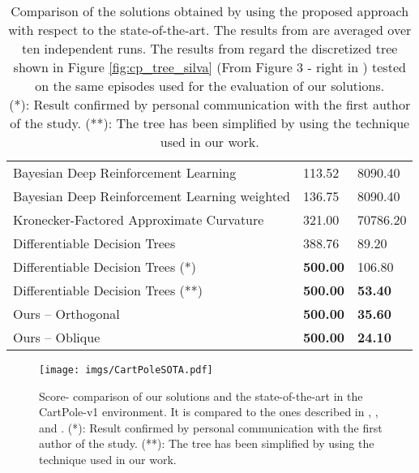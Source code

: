 \documentclass[review,english]{elsarticle}
\begin{document}
\begin{table}[p]
\begin{tabularx}{1\linewidth}{|X|l|l|}
    Bayesian Deep Reinforcement Learning {\cite{xuan_bayesian_2018}}           & 113.52 & 8090.40 \\
    Bayesian Deep Reinforcement Learning weighted {\cite{xuan_bayesian_2018}}  & 136.75 & 8090.40 \\
    Kronecker-Factored Approximate Curvature {\cite{van_der_aalst_optimizing_2020}} & 321.00 & 70786.20 \\
    Differentiable Decision Trees {\cite{silva_optimization_2020}} & 388.76 & {89.20} \\ 
    Differentiable Decision Trees {\cite{silva_optimization_2020}} (*) & \textbf{500.00} & 106.80 \\
    Differentiable Decision Trees {\cite{silva_optimization_2020}} (**) & \textbf{500.00} & \textbf{53.40} \\ \hline
    Ours – Orthogonal & \textbf{500.00} & \textbf{35.60}  \\
    Ours – Oblique & \textbf{500.00} & \textbf{24.10}  \\ \hline 
    \end{tabularx}

    \caption{Comparison of the solutions obtained by using the proposed approach with respect to the state-of-the-art.
    The results from \cite{meng_qualitative_2019} are averaged over ten independent runs.
    The results from \cite{silva_optimization_2020} regard the discretized tree shown in Figure \ref{fig:cp_tree_silva} (From Figure 3 - right in \cite{silva_optimization_2020}) tested on the same episodes used for the evaluation of our solutions.
    \\
    (*): Result confirmed by personal communication with the first author of the study.
    (**): The tree has been simplified by using the technique used in our work.
    }
    \label{tab:cp_sota_comparison}
\end{table}

\begin{figure}[ht!]
    \centering
    \texttt{[image: imgs/CartPoleSOTA.pdf]}
    \caption{Score- comparison of our solutions and the state-of-the-art in the CartPole-v1 environment. It is compared to the ones described in \cite{meng_qualitative_2019}, \cite{xuan_bayesian_2018} \cite{silva_optimization_2020}, and \cite{van_der_aalst_optimizing_2020}.
    (*): Result confirmed by personal communication with the first author of the study.
    (**): The tree has been simplified by using the technique used in our work.
    }
    \label{fig:cp_sota_comparison}
\end{figure}
\end{document}
